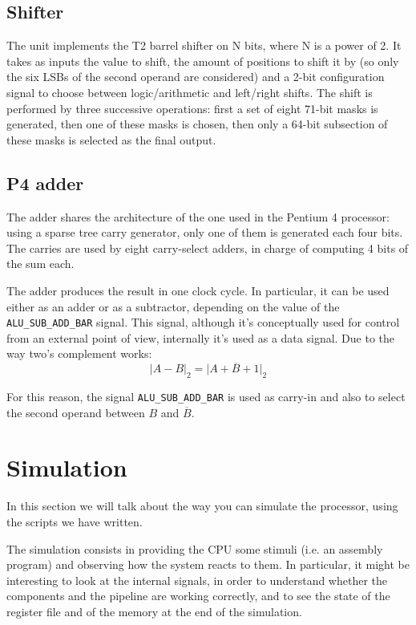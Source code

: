 \subsection{Shifter}

The unit implements the T2 barrel shifter on N bits, where N is a power of 2. 
It takes as inputs the value to shift, the amount of positions to shift it by (so only the six LSBs of the second operand are considered) and a 2-bit configuration signal to choose between logic/arithmetic and left/right shifts. 
The shift is performed by three successive operations: first a set of eight 71-bit masks is generated, then one of these masks is chosen, then only a 64-bit subsection of these masks is selected as the final output.

\subsection{P4 adder}

The adder shares the architecture of the one used in the Pentium 4 processor: using a sparse tree carry generator, only one of them is generated each four bits.
The carries are used by eight carry-select adders, in charge of computing 4 bits of the sum each.

The adder produces the result in one clock cycle. 
In particular, it can be used either as an adder or as a subtractor, depending on the value of  the \texttt{ALU\_SUB\_ADD\_BAR} signal. 
This signal, although it's conceptually used for control from an external point of view, internally it's used as a data signal. 
Due to the way two's complement works: 
\[
    \rvert A - B \rvert_2 = \rvert A + \overline{B} + 1 \rvert_2
\]

For this reason, the signal \texttt{ALU\_SUB\_ADD\_BAR} is used as carry-in and also to select the second operand between $B$ and $\overline{B}$.

\section{Simulation} \label{sim_chap}

In this section we will talk about the way you can simulate the processor, using the scripts we have written.

The simulation consists in providing the CPU some stimuli (i.e. an assembly program) and observing how the system reacts to them. 
In particular, it might be interesting to look at the internal signals, in order to understand whether the components and the pipeline are working correctly, and to see the state of the register file and of the memory at the end of the simulation.


